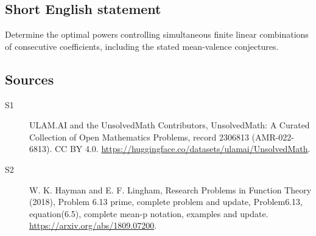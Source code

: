 \documentclass[11pt]{article}
\begin{document}
\subsection{Short English statement}
Determine the optimal powers controlling simultaneous finite linear combinations of consecutive coefficients, including the stated mean-valence conjectures.
\subsection{Sources}
\begin{description}
\item[\hypertarget{source:2306813:1}{S1}] ULAM.AI and the UnsolvedMath Contributors, UnsolvedMath: A Curated Collection of Open Mathematics Problems, record 2306813 (AMR-022-6813). CC BY 4.0. \url{https://huggingface.co/datasets/ulamai/UnsolvedMath}.
\item[\hypertarget{source:2306813:2}{S2}] W. K. Hayman and E. F. Lingham, Research Problems in Function Theory (2018), Problem 6.13 prime, complete problem and update, Problem6.13, equation(6.5), complete mean-p notation, examples and update. \url{https://arxiv.org/abs/1809.07200}.
\end{description}
\label{end:2306813}
\end{document}
